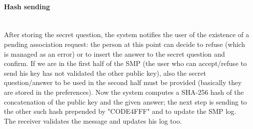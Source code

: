 \paragraph{Hash sending} \hspace{0pt} \\
After storing the secret question, the system notifies the user of the existence of a pending association request: the person at this point can decide to refuse (which is managed as an error) or to insert the answer to the secret question and confirm. If we are in the first half of the SMP (the user who can accept/refuse to send his key has not validated the other public key), also the secret question/answer to be used in the second half must be provided (basically they are stored in the preferences). Now the system computes a SHA-256 hash of the concatenation of the public key and the given answer; the next step is sending to the other such hash prepended by "CODE4FFF" and to update the SMP log. The receiver validates the message and updates his log too.